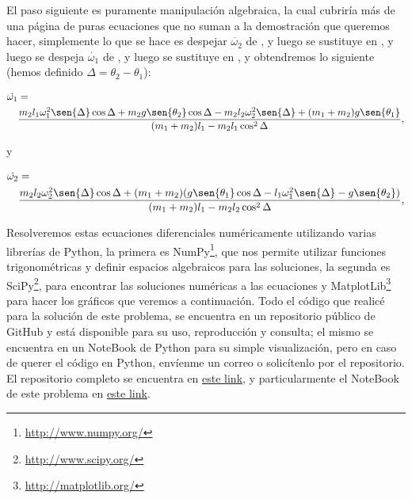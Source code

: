 \documentclass[a4paper,10pt]{article}
\numberwithin{equation}{section}
\begin{document}
El paso siguiente es puramente manipulación algebraica, la cual cubriría más de una 
página de puras ecuaciones que no suman a la demostración que queremos hacer, simplemente
lo que se hace es despejar $\dot{\omega_2}$ de , y luego se sustituye 
en , y luego se despeja $\dot{\omega_1}$ de , y luego se sustituye 
en , y obtendremos lo siguiente (hemos definido $\Delta = \theta_2 - \theta_1$):

\begin{align}
\begin{split}
\dot{\omega_1} &= \\
   &\frac{m_2 l_1 \omega_1^2 \sen{\Delta}\cos{\Delta}
 + m_2 g \sen{\theta_2}\cos{\Delta}-m_2 l_2 \omega_2^2\sen{\Delta} 
 +(m_1 + m_2)g \sen{\theta_1}}{(m_1 + m_2) l_1 - m_2 l_1 \cos^2{\Delta}},
\end{split}
 \end{align}

y

\begin{align}
\begin{split}
\dot{\omega_2} &= \\
   &\frac{m_2 l_2 \omega_2^2 \sen{\Delta}\cos{\Delta}
 + (m_1 + m_2)(g \sen{\theta_1}\cos{\Delta} - l_1 \omega_1^2\sen{\Delta}
 - g\sen{\theta_2})}{(m_1 + m_2) l_1 - m_2 l_2 \cos^2{\Delta}},
\end{split}
 \end{align}

Resolveremos estas ecuaciones diferenciales numéricamente utilizando varias librerías 
de Python, la primera es NumPy\footnote{\href{http://www.numpy.org/}{http://www.numpy.org/}},
que nos permite utilizar funciones trigonométricas y definir espacios algebraicos para 
las soluciones, la segunda es SciPy\footnote{\href{http://www.scipy.org/}{http://www.scipy.org/}},
para encontrar las soluciones numéricas a las ecuaciones y MatplotLib\footnote{
\href{http://matplotlib.org/}{http://matplotlib.org/}} para hacer los gráficos que 
veremos a continuación. Todo el código que realicé para la solución de este problema,
se encuentra en un repositorio público de GitHub y está disponible para su uso, reproducción
y consulta; el mismo se encuentra en un NoteBook de Python para su simple visualización,
pero en caso de querer el código en Python, envíenme un correo o solicítenlo por el 
repositorio. El repositorio completo se encuentra en \href{https://github.com/FavioVazquez/MecanicaClasica-PCF}{\color{blue} este link},
y particularmente el NoteBook de este problema en \href{https://github.com/FavioVazquez/MecanicaClasica-PCF/blob/master/Tarea4/Problema\%202.ipynb}{\color{blue} este link}.
\end{document}

